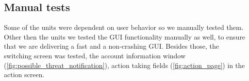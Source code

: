\subsection{Manual tests}
Some of the units were dependent on user behavior so we manually tested them. Other then the units we tested the 
GUI functionality manually as well, to ensure that we are delivering a fast and a non-crashing GUI.
Besides those, the switching screen was tested, the account information window (\ref{fig:possible_threat_notification}), action taking fields (\ref{fig:action_page}) in the action
screen.


